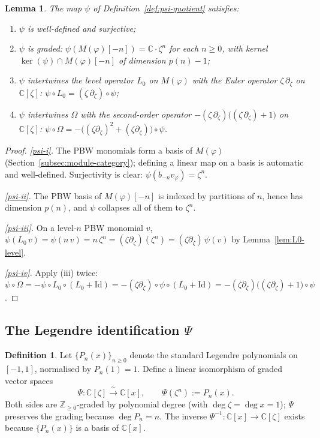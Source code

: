 \documentclass[12pt]{amsart}
\theoremstyle{plain}
\newtheorem{lemma}[theorem]{Lemma}
\theoremstyle{definition}
\newtheorem{definition}[theorem]{Definition}
\newcommand{\CC}{\mathbb{C}}
\newcommand{\ZZ}{\mathbb{Z}}
\newcommand{\Mf}{M(\varphi)}          %
\newcommand{\vf}{v_\varphi}           %
\newcommand{\Om}{\Omega}              %
\begin{document}
\begin{lemma}
\label{lem:psi-properties}
The map $\psi$ of Definition~\ref{def:psi-quotient} satisfies:
\begin{enumerate}[label=\textup{(\roman*)}]
  \item\label{psi-i} $\psi$ is well-defined and surjective;
  \item\label{psi-ii} $\psi$ is graded: $\psi(\Mf[-n]) = \CC\cdot \zeta^n$ for
        each $n\geq 0$, with kernel
        $\ker(\psi)\cap\Mf[-n]$ of dimension $p(n)-1$;
  \item\label{psi-iii} $\psi$ intertwines the level operator $L_0$ on $\Mf$
        with the Euler operator $\zeta\,\partial_\zeta$ on $\CC[\zeta]$:
        $\psi\circ L_0 = (\zeta\,\partial_\zeta)\circ\psi$;
  \item\label{psi-iv} $\psi$ intertwines $\Om$ with the second-order
        operator $-(\zeta\,\partial_\zeta)\bigl((\zeta\,\partial_\zeta)+1\bigr)$ on $\CC[\zeta]$:
        $\psi\circ\Om = -\bigl((\zeta\partial_\zeta)^2+(\zeta\partial_\zeta)\bigr)\circ\psi$.
\end{enumerate}
\end{lemma}

\begin{proof}
\emph{\ref{psi-i}.} The PBW monomials form a basis of $\Mf$
(Section~\ref{subsec:module-category}); defining a linear map on a basis
is automatic and well-defined. Surjectivity is clear: $\psi(b_{-n}\vf) = \zeta^n$.

\emph{\ref{psi-ii}.} The PBW basis of $\Mf[-n]$ is indexed by partitions
of $n$, hence has dimension $p(n)$, and $\psi$ collapses all of them
to $\zeta^n$.

\emph{\ref{psi-iii}.} On a level-$n$ PBW monomial $v$,
$\psi(L_0\,v) = \psi(n\,v) = n\,\zeta^n = (\zeta\partial_\zeta)(\zeta^n) = (\zeta\partial_\zeta)\,\psi(v)$
by Lemma~\ref{lem:L0-level}.

\emph{\ref{psi-iv}.} Apply (iii) twice: $\psi\circ\Om = -\psi\circ L_0\circ
(L_0+\mathrm{Id}) = -(\zeta\partial_\zeta)\circ\psi\circ(L_0+\mathrm{Id}) =
-(\zeta\partial_\zeta)\bigl((\zeta\partial_\zeta)+1\bigr)\circ\psi$.
\end{proof}

\subsection{The Legendre identification $\Psi$}
\label{subsec:legendre-id}

\begin{definition}
\label{def:Psi}
Let $\{P_n(x)\}_{n\geq 0}$ denote the standard Legendre polynomials on
$[-1,1]$, normalised by $P_n(1)=1$. Define a linear isomorphism of graded
vector spaces
\[
  \Psi\colon \CC[\zeta] \xrightarrow{\;\sim\;} \CC[x],
  \qquad \Psi(\zeta^n) := P_n(x).
\]
Both sides are $\ZZ_{\geq 0}$-graded by polynomial degree (with
$\deg \zeta = \deg x = 1$); $\Psi$ preserves the grading because $\deg P_n = n$.
The inverse $\Psi^{-1}\colon \CC[x]\to\CC[\zeta]$ exists because
$\{P_n(x)\}$ is a basis of $\CC[x]$.
\end{definition}
\end{document}
